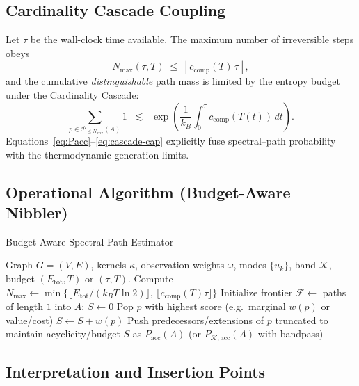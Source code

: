 \subsection{Cardinality Cascade Coupling}
\label{subsec:cardinality-cascade-coupling}

Let $\tau$ be the wall-clock time available. The maximum number of irreversible steps obeys
\begin{equation}
N_{\max}(\tau,T) \;\le\; \left\lfloor c_{\mathrm{comp}}(T)\,\tau \right\rfloor,
\label{eq:Nmax-time}
\end{equation}
and the cumulative \emph{distinguishable} path mass is limited by the entropy budget
under the Cardinality Cascade:
\begin{equation}
\sum_{p\in\mathcal{P}_{\le N_{\max}}(A)} 1
\;\;\lesssim\;\;
\exp\!\left(\frac{1}{k_B}\int_0^\tau c_{\mathrm{comp}}(T(t))\,dt\right).
\label{eq:cascade-cap}
\end{equation}
Equations~\eqref{eq:Pacc}–\eqref{eq:cascade-cap} explicitly fuse spectral–path probability with the
thermodynamic generation limits.

\subsection{Operational Algorithm (Budget-Aware Nibbler)}
\label{subsec:algo}

\begin{algorithm}[H]
\caption{Budget-Aware Spectral Path Estimator}
\label{alg:budget-nibbler}
\begin{algorithmic}[1]
\Require Graph $G=(V,E)$, kernels $\kappa$, observation weights $\omega$, modes $\{u_k\}$,
band $\mathcal{K}$, budget $(E_{\mathrm{tot}},T)$ or $(\tau,T)$.
\State Compute $N_{\max} \leftarrow \min\!\Big\{\lfloor E_{\mathrm{tot}}/(k_BT\ln2)\rfloor,\,\lfloor c_{\mathrm{comp}}(T)\tau\rfloor\Big\}$
\State Initialize frontier $\mathcal{F}\leftarrow$ paths of length $1$ into $A$; $S\leftarrow 0$
  \State Pop $p$ with highest score (e.g.\ marginal $w(p)$ or value/cost)
  \State $S\leftarrow S + w(p)$
  \State Push predecessors/extensions of $p$ truncated to maintain acyclicity/budget
\EndWhile
\State \Return $S$ as $P_{\mathrm{acc}}(A)$ (or $P_{\mathcal{K},\mathrm{acc}}(A)$ with bandpass)
\end{algorithmic}
\end{algorithm}

\subsection{Interpretation and Insertion Points}
\label{subsec:interpretation-insertion}

